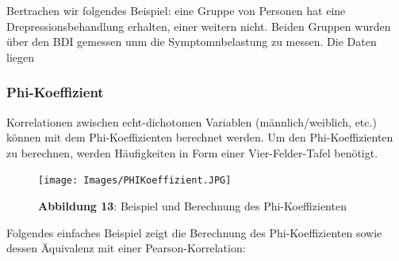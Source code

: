 \documentclass[]{article}
\newenvironment{Shaded}{\begin{snugshade}}{\end{snugshade}}
\newcommand{\CommentTok}[1]{\textcolor[rgb]{0.56,0.35,0.01}{\textit{#1}}}
\newcommand{\DataTypeTok}[1]{\textcolor[rgb]{0.13,0.29,0.53}{#1}}
\newcommand{\DecValTok}[1]{\textcolor[rgb]{0.00,0.00,0.81}{#1}}
\newcommand{\KeywordTok}[1]{\textcolor[rgb]{0.13,0.29,0.53}{\textbf{#1}}}
\newcommand{\NormalTok}[1]{#1}
\newcommand{\OperatorTok}[1]{\textcolor[rgb]{0.81,0.36,0.00}{\textbf{#1}}}
\newcommand{\OtherTok}[1]{\textcolor[rgb]{0.56,0.35,0.01}{#1}}
\newcommand{\StringTok}[1]{\textcolor[rgb]{0.31,0.60,0.02}{#1}}
\begin{document}
Bertrachen wir folgendes Beispiel: eine Gruppe von Personen hat eine Drepressionsbehandlung erhalten, einer weitern nicht. Beiden Gruppen wurden über den BDI gemessen unm die Symptomnbelastung zu messen. Die Daten liegen

\hypertarget{phi-koeffizient}{%
\subsubsection*{Phi-Koeffizient}\label{phi-koeffizient}}

Korrelationen zwischen echt-dichotomen Variablen (männlich/weiblich, etc.) können mit dem Phi-Koeffizienten berechnet werden. Um den Phi-Koeffizienten zu berechnen, werden Häufigkeiten in Form einer Vier-Felder-Tafel benötigt.

\begin{figure}
\centering
\texttt{[image: Images/PHIKoeffizient.JPG]}
\caption{\textbf{Abbildung 13}: Beispiel und Berechnung des Phi-Koeffizienten}
\end{figure}

Folgendes einfaches Beispiel zeigt die Berechnung des Phi-Koeffizienten sowie dessen Äquivalenz mit einer Pearson-Korrelation:

\begin{Shaded}
\end{Shaded}
\end{document}
